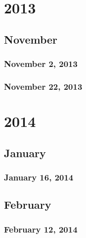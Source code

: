 \part{2013}
\chapter{November}
\section{November 2, 2013}

\section{November 22, 2013}

\part{2014}
\chapter{January}
\section{January 16, 2014}



\chapter{February}
\section{February 12, 2014}

